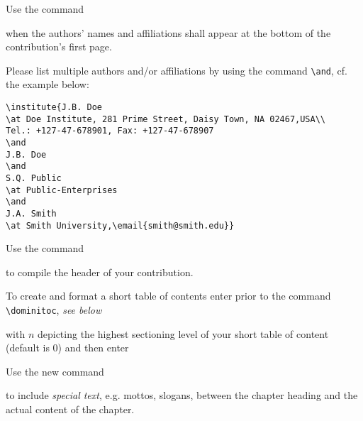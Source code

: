 \documentclass[graybox]{svmult}
\begin{document}
\begin{refguide}
\begin{sloppy}
Use the command

\cprotect{}


when the authors' names and affiliations shall appear at the bottom of the
contribution's first page.


Please list multiple authors and/or affiliations by using the command \verb|\and|, cf.
the example below:

\verb|\institute{J.B. Doe|\\
\verb|\at Doe Institute, 281 Prime Street, Daisy Town, NA 02467,USA\\|\\
\verb|Tel.: +127-47-678901, Fax: +127-47-678907|\\
\verb|\and|\\
\verb|J.B. Doe|\\
\verb|\and|\\
\verb|S.Q. Public|\\
\verb|\at Public-Enterprises|\\
\verb|\and|\\
\verb|J.A. Smith|\\
\verb|\at Smith University,\email{smith@smith.edu}}|


Use the command

\cprotect\boxtext{\verb|\maketitle|}


to compile the header of your contribution.


To create and format a short table of contents enter prior to the command
\verb|\dominitoc|, \textit{see below}

\cprotect\boxtext{\verb|\setcounter{minitocdepth}{|$\langle$$n$$\rangle$\verb|}|}


with $n$ depicting the highest sectioning level of your short table of content
(default is 0) and then enter

\cprotect\boxtext{\verb|\dominitoc|}


Use the new command

\cprotect{}


to include \textit{special text}, e.g. mottos, slogans, between the chapter heading and
the actual content of the chapter.



\end{sloppy}
\end{refguide}
\end{document}
